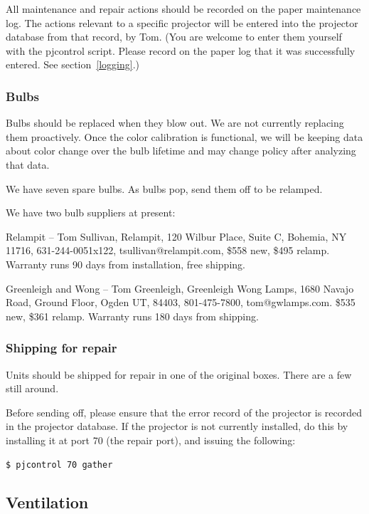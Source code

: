 \documentclass[11pt]{article}
\begin{document}
All maintenance and repair actions should be recorded on the paper
maintenance log.  The actions relevant to a specific projector will be
entered into the projector database from that record, by Tom.  (You
are welcome to enter them yourself with the pjcontrol script.  Please
record on the paper log that it was successfully entered.  See
section~\ref{logging}.) 


\subsubsection{Bulbs}

Bulbs should be replaced when they blow out.  We are not currently
replacing them proactively.  Once the color calibration is functional,
we will be keeping data about color change over the bulb lifetime and
may change policy after analyzing that data.

We have seven spare bulbs.  As bulbs pop, send them off to be
relamped.

We have two bulb suppliers at present:

Relampit -- Tom Sullivan, Relampit, 120 Wilbur Place, Suite C,
Bohemia, NY 11716, 631-244-0051x122, tsullivan@relampit.com, \$558
new, \$495 relamp.  Warranty runs 90 days from installation, free
shipping.

Greenleigh and Wong -- Tom Greenleigh, Greenleigh Wong Lamps, 1680
Navajo Road, Ground Floor, Ogden UT, 84403, 801-475-7800,
tom@gwlamps.com. \$535 new, \$361 relamp.  Warranty runs 180 days from
shipping.



\subsubsection{Shipping for repair}

Units should be shipped for repair in one of the original boxes. There
are a few still around.

Before sending off, please ensure that the error record of the
projector is recorded in the projector database. If the projector is
not currently installed, do this by installing it at port 70 (the
repair port), and issuing the following:

\begin{verbatim}
$ pjcontrol 70 gather
\end{verbatim}




\subsection{Ventilation}
\end{document}
